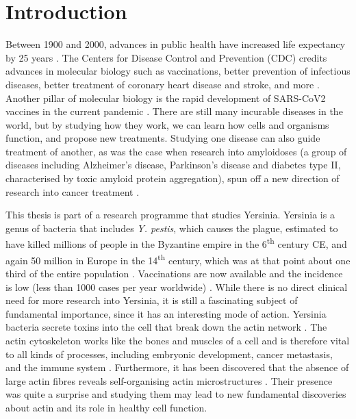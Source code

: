 \chapter{Introduction}
Between 1900 and 2000, advances in public health have increased life expectancy by 25 years \cite{Bunker1994}. The Centers for Disease Control and Prevention (CDC) credits advances in molecular biology such as vaccinations, better prevention of infectious diseases, better treatment of coronary heart disease and stroke, and more \cite{CDC1999}. Another pillar of molecular biology is the rapid development of SARS-CoV2 vaccines in the current pandemic \cite{Sadoff2021, Polack2020}. There are still many incurable diseases in the world, but by studying how they work, we can learn how cells and organisms function, and propose new treatments. Studying one disease can also guide treatment of another, as was the case when research into amyloidoses (a group of diseases including Alzheimer's disease, Parkinson's disease and diabetes type II, characterised by toxic amyloid protein aggregation), spun off a new direction of research into cancer treatment \cite{Gallardo2016}.

This thesis is part of a research programme that studies Yersinia. Yersinia is a genus of bacteria that includes \emph{Y. pestis}, which causes the plague, estimated to have killed millions of people in the Byzantine empire in the 6\textsuperscript{th} century CE, and again 50 million in Europe in the 14\textsuperscript{th} century, which was at that point about one third of the entire population \cite{Zietz2004}. Vaccinations are now available and the incidence is low (less than 1000 cases per year worldwide) \cite{WHO2014}. 
While there is no direct clinical need for more research into Yersinia, it is still a fascinating subject of fundamental importance, since it has an interesting mode of action. Yersinia bacteria secrete toxins into the cell that break down the actin network \cite{Ono2017}. The actin cytoskeleton works like the bones and muscles of a cell and is therefore vital to all kinds of processes, including embryonic development, cancer metastasis, and the immune system \cite{molbio, Horwitz2003, Umeda2016, Barnat2017, Lin2017}. Furthermore, it has been discovered that the absence of large actin fibres reveals self-organising actin microstructures \cite{Fritzsche2017a}. Their presence was quite a surprise and studying them may lead to new fundamental discoveries about actin and its role in healthy cell function.

